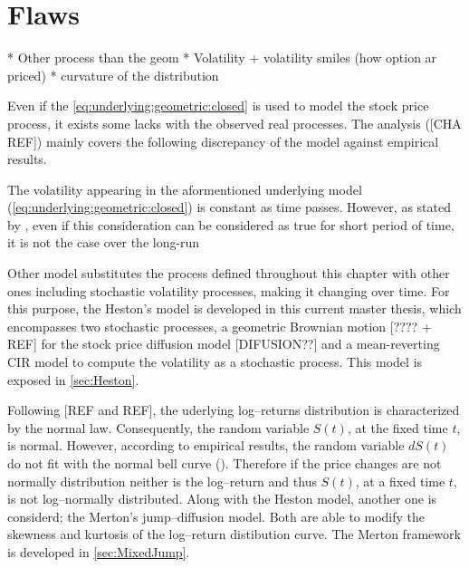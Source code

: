 \documentclass[a4paper, 12pt]{report}
\newcommand{\St}{S\left(t\right)}
\begin{document}
\section{Flaws}
\label{sec:Flaws}


* Other process than the geom
* Volatility + volatility smiles (how option ar priced)
* curvature of the distribution

Even if the \cref{eq:underlying:geometric:closed} is used to model the stock price process, it exists some lacks with the observed real processes. The analysis ([CHA REF]) mainly covers the following discrepancy of the model against empirical results.
  
The volatility appearing in the aformentioned underlying model (\ref{eq:underlying:geometric:closed}) is constant as time passes. However, as stated by \citet{teneng2011limitations}, even if this consideration can be considered as true for short period of time, it is not the case over the long-run 

Other model substitutes the process defined throughout this chapter with other ones including stochastic volatility processes, making it changing over time.
For this purpose, the Heston's model is developed in this current master thesis, which encompasses two stochastic processes, a geometric Brownian motion [???? + REF] for the stock price diffusion model [DIFUSION??] and a mean-reverting CIR model to compute the volatility as a stochastic process.
This model is exposed in \cref{sec:Heston}.

Following [REF and REF], the uderlying log--returns distribution is characterized by the normal law. Consequently, the random variable $\St$, at the fixed time $t$, is normal. 
However, according to empirical results, the random variable $d\St$ do not fit with the normal bell curve (\citet{clark1973}).
Therefore if the price changes are not normally distribution neither is the log--return and thus $\St$, at a fixed time $t$, is not log--normally distributed.
Along with the Heston model, another one is considerd; the Merton's jump--diffusion model. Both are able to modify the skewness and kurtosis of the log--return distibution curve. The Merton framework is developed in \cref{sec:MixedJump}. 
\end{document}
